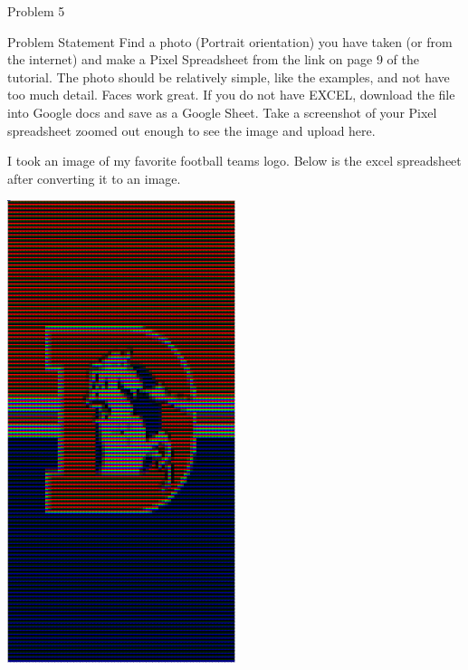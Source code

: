 \begin{problem}{Problem 5}
    \begin{statement}{Problem Statement}
        Find a photo (Portrait orientation) you have taken (or from the internet) and make a Pixel Spreadsheet from the link on page 9 of the tutorial. The photo should be relatively simple, like the 
        examples, and not have too much detail. Faces work great. If you do not have EXCEL, download the file into Google docs and save as a Google Sheet. Take a screenshot of your Pixel spreadsheet 
        zoomed out enough to see the image and upload here.
    \end{statement}

    \begin{highlight}[Solution]
        I took an image of my favorite football teams logo. Below is the excel spreadsheet after converting it to an image.

        \begin{center}
            \includegraphics[width=0.5\textwidth]{Images/Broncos.png}
        \end{center}
    \end{highlight}
\end{problem}

